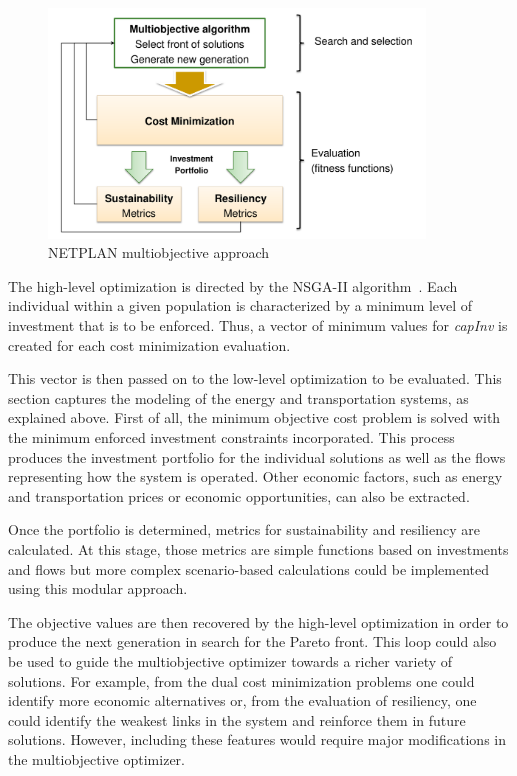 \documentclass{article}
\begin{document}
\begin{figure}
\begin{center}
\includegraphics[width=100mm]{figs/multiobjective}
\end{center}
\caption{NETPLAN multiobjective approach}
\label{fig:multiobjective}
\end{figure}

The high-level optimization is directed by the NSGA-II algorithm~\cite{deb}. Each individual within a given population is characterized by a minimum level of investment that is to be enforced. Thus, a vector of minimum values for \emph{capInv} is created for each cost minimization evaluation.

This vector is then passed on to the low-level optimization to be evaluated. This section captures the modeling of the energy and transportation systems, as explained above. First of all, the minimum objective cost problem is solved with the minimum enforced investment constraints incorporated. This process produces the investment portfolio for the individual solutions as well as the flows representing how the system is operated. Other economic factors, such as energy and transportation prices or economic opportunities, can also be extracted.

Once the portfolio is determined, metrics for sustainability and resiliency are calculated. At this stage, those metrics are simple functions based on investments and flows but more complex scenario-based calculations could be implemented using this modular approach.

The objective values are then recovered by the high-level optimization in order to produce the next generation in search for the Pareto front. This loop could also be used to guide the multiobjective optimizer towards a richer variety of solutions. For example, from the dual cost minimization problems one could identify more economic alternatives or, from the evaluation of resiliency, one could identify the weakest links in the system and reinforce them in future solutions. However, including these features would require major modifications in the multiobjective optimizer.
\end{document}
